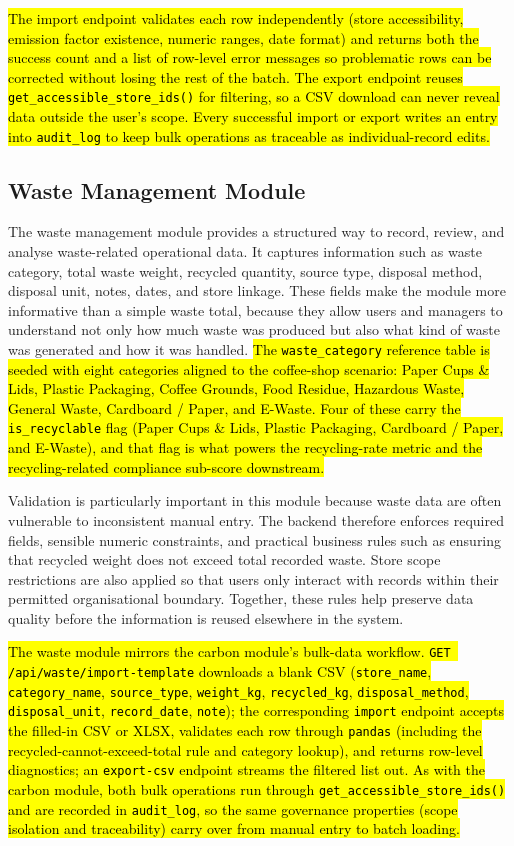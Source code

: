 \documentclass[11pt,a4paper]{article}
\newcommand{\new}[1]{\hl{#1}}
\begin{document}
\new{The import endpoint validates each row independently (store accessibility, emission factor existence, numeric ranges, date format) and returns both the success count and a list of row-level error messages so problematic rows can be corrected without losing the rest of the batch. The export endpoint reuses \texttt{get\_accessible\_store\_ids()} for filtering, so a CSV download can never reveal data outside the user's scope. Every successful import or export writes an entry into \texttt{audit\_log} to keep bulk operations as traceable as individual-record edits.}

\subsection{Waste Management Module}
The waste management module provides a structured way to record, review, and analyse waste-related operational data. It captures information such as waste category, total waste weight, recycled quantity, source type, disposal method, disposal unit, notes, dates, and store linkage. These fields make the module more informative than a simple waste total, because they allow users and managers to understand not only how much waste was produced but also what kind of waste was generated and how it was handled. \new{The \texttt{waste\_category} reference table is seeded with eight categories aligned to the coffee-shop scenario: Paper Cups \& Lids, Plastic Packaging, Coffee Grounds, Food Residue, Hazardous Waste, General Waste, Cardboard / Paper, and E-Waste. Four of these carry the \texttt{is\_recyclable} flag (Paper Cups \& Lids, Plastic Packaging, Cardboard / Paper, and E-Waste), and that flag is what powers the recycling-rate metric and the recycling-related compliance sub-score downstream.}

Validation is particularly important in this module because waste data are often vulnerable to inconsistent manual entry. The backend therefore enforces required fields, sensible numeric constraints, and practical business rules such as ensuring that recycled weight does not exceed total recorded waste. Store scope restrictions are also applied so that users only interact with records within their permitted organisational boundary. Together, these rules help preserve data quality before the information is reused elsewhere in the system.

\new{The waste module mirrors the carbon module's bulk-data workflow. \texttt{GET /api/waste/import-template} downloads a blank CSV (\texttt{store\_name}, \texttt{category\_name}, \texttt{source\_type}, \texttt{weight\_kg}, \texttt{recycled\_kg}, \texttt{disposal\_method}, \texttt{disposal\_unit}, \texttt{record\_date}, \texttt{note}); the corresponding \texttt{import} endpoint accepts the filled-in CSV or XLSX, validates each row through \texttt{pandas} (including the recycled-cannot-exceed-total rule and category lookup), and returns row-level diagnostics; an \texttt{export-csv} endpoint streams the filtered list out. As with the carbon module, both bulk operations run through \texttt{get\_accessible\_store\_ids()} and are recorded in \texttt{audit\_log}, so the same governance properties (scope isolation and traceability) carry over from manual entry to batch loading.}
\end{document}
